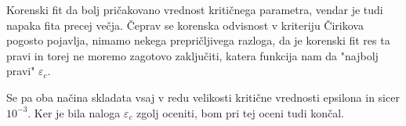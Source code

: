 \documentclass{article}
\begin{document}
Korenski fit da bolj pričakovano vrednost kritičnega parametra, vendar je tudi napaka fita precej večja. Čeprav se korenska odvisnost v kriteriju Čirikova pogosto pojavlja, nimamo nekega prepričljivega razloga, da je korenski fit res ta pravi in torej ne moremo zagotovo zaključiti, katera funkcija nam da "najbolj pravi" $\varepsilon_c$.

Se pa oba načina skladata vsaj v redu velikosti kritične vrednosti epsilona in sicer $10^{-3}$. Ker je bila naloga $\varepsilon_c$ zgolj oceniti, bom pri tej oceni tudi končal.
\end{document}
